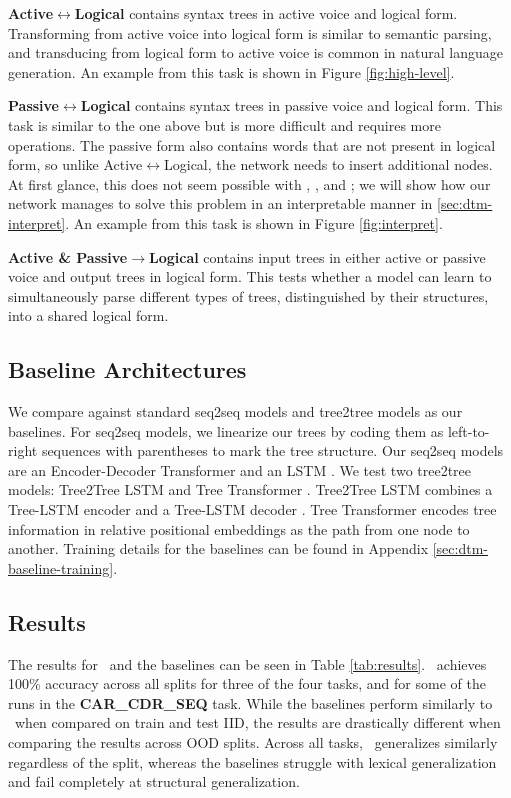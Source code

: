 \textbf{Active$\leftrightarrow$Logical} contains syntax trees in active voice and logical form. Transforming from active voice into logical form is similar to semantic parsing, and transducing from logical form to active voice is common in natural language generation. An example from this task is shown in Figure \ref{fig:high-level}.

\textbf{Passive$\leftrightarrow$Logical}
contains syntax trees in passive voice and logical form. This task is similar to the one above but is more difficult and requires more operations. The passive form also contains words that are not present in logical form, so unlike Active$\leftrightarrow$Logical, the network needs to insert additional nodes. At first glance, this does not seem possible with \car, \cdr, and \cons; we will show how our network manages to solve this problem in an interpretable manner in \textsection \ref{sec:dtm-interpret}. An example from this task is shown in Figure \ref{fig:interpret}.

\textbf{Active \& Passive$\rightarrow$Logical} contains input trees in either active or passive voice and output trees in logical form. This tests whether a model can learn to simultaneously parse different types of trees, distinguished  by their structures, into a shared logical form. 

\subsection{Baseline Architectures}
We compare against standard seq2seq \citep{sutskever2014sequence} models and tree2tree models as our baselines. For seq2seq models, we linearize our trees by coding them as left-to-right sequences with parentheses to mark the tree structure. Our seq2seq models are an Encoder-Decoder Transformer \citep{vaswani2017attention} and an LSTM \citep{hochreiter_long_1997}. We test two tree2tree models: Tree2Tree LSTM \citep{NEURIPS2018_d759175d} and Tree Transformer \citep{shiv_novel_2019}. Tree2Tree LSTM combines a Tree-LSTM encoder \citep{tai-etal-2015-improved} and a Tree-LSTM decoder \citep{dong2016language}. Tree Transformer encodes tree information in relative positional embeddings as the path from one node to another. Training details for the baselines can be found in Appendix \ref{sec:dtm-baseline-training}.

\subsection{Results} \label{sec:dtm-results}
The results for \blackboard\ and the baselines can be seen in Table \ref{tab:results}. \blackboard\ achieves 100\% accuracy across all splits for three of the four tasks, and for some of the runs in the  \textbf{CAR\_CDR\_SEQ} task. While the baselines perform similarly to \blackboard\ when compared on train and test IID, the results are drastically different when comparing the results across OOD splits. Across all tasks, \blackboard\ generalizes similarly regardless of the split, whereas the baselines struggle with lexical generalization and fail completely at structural generalization.

